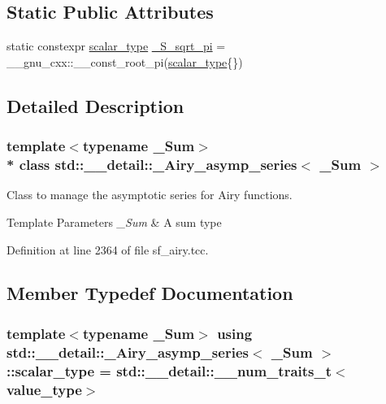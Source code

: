 \subsection*{Static Public Attributes}
\begin{DoxyCompactItemize}
\item 
static constexpr \hyperlink{classstd_1_1____detail_1_1__Airy__asymp__series_a17ec74b13ebc38d5531bf27cd31684fb}{scalar\+\_\+type} \hyperlink{classstd_1_1____detail_1_1__Airy__asymp__series_a0a4d017f86429e22f5939e689e7b93ca}{\+\_\+\+S\+\_\+sqrt\+\_\+pi} = \+\_\+\+\_\+gnu\+\_\+cxx\+::\+\_\+\+\_\+const\+\_\+root\+\_\+pi(\hyperlink{classstd_1_1____detail_1_1__Airy__asymp__series_a17ec74b13ebc38d5531bf27cd31684fb}{scalar\+\_\+type}\{\})
\end{DoxyCompactItemize}


\subsection{Detailed Description}
\subsubsection*{template$<$typename \+\_\+\+Sum$>$\\*
class std\+::\+\_\+\+\_\+detail\+::\+\_\+\+Airy\+\_\+asymp\+\_\+series$<$ \+\_\+\+Sum $>$}

Class to manage the asymptotic series for Airy functions.


\begin{DoxyTemplParams}{Template Parameters}
{\em \+\_\+\+Sum} & A sum type \\
\hline
\end{DoxyTemplParams}


Definition at line 2364 of file sf\+\_\+airy.\+tcc.



\subsection{Member Typedef Documentation}
\subsubsection[{\texorpdfstring{scalar\+\_\+type}{scalar_type}}]{\setlength{\rightskip}{0pt plus 5cm}template$<$typename \+\_\+\+Sum$>$ using {\bf std\+::\+\_\+\+\_\+detail\+::\+\_\+\+Airy\+\_\+asymp\+\_\+series}$<$ \+\_\+\+Sum $>$\+::{\bf scalar\+\_\+type} =  std\+::\+\_\+\+\_\+detail\+::\+\_\+\+\_\+num\+\_\+traits\+\_\+t$<${\bf value\+\_\+type}$>$}\hypertarget{classstd_1_1____detail_1_1__Airy__asymp__series_a17ec74b13ebc38d5531bf27cd31684fb}{}\label{classstd_1_1____detail_1_1__Airy__asymp__series_a17ec74b13ebc38d5531bf27cd31684fb}


